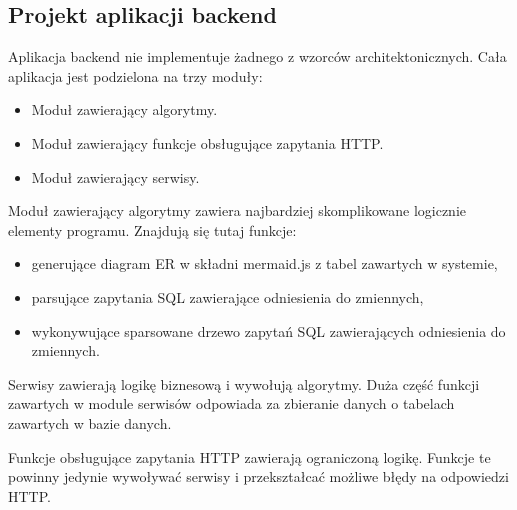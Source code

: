 

\subsection{Projekt aplikacji backend}

Aplikacja backend nie implementuje żadnego z wzorców architektonicznych. Cała
aplikacja jest podzielona na trzy moduły:

\begin{itemize}
    \item Moduł zawierający algorytmy.
    \item Moduł zawierający funkcje obsługujące zapytania HTTP.
    \item Moduł zawierający serwisy.
\end{itemize}

Moduł zawierający algorytmy zawiera najbardziej skomplikowane logicznie elementy
programu. Znajdują się tutaj funkcje:

\begin{itemize}
    \item generujące diagram ER w składni mermaid.js z tabel zawartych w
        systemie,
    \item parsujące zapytania SQL zawierające odniesienia do zmiennych,
    \item wykonywujące sparsowane drzewo zapytań SQL zawierających odniesienia
        do zmiennych.
\end{itemize}

Serwisy zawierają logikę biznesową i wywołują algorytmy. Duża część funkcji
zawartych w module serwisów odpowiada za zbieranie danych o tabelach zawartych w
bazie danych.

Funkcje obsługujące zapytania HTTP zawierają ograniczoną logikę. Funkcje te
powinny jedynie wywoływać serwisy i przekształcać możliwe błędy na odpowiedzi
HTTP.
